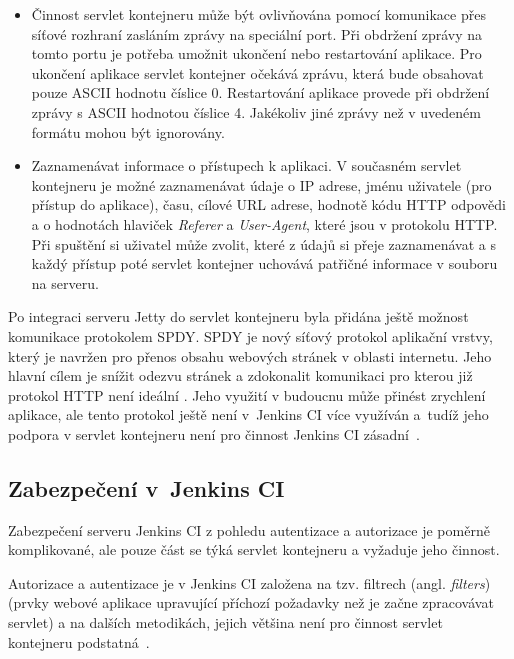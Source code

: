 \begin{itemize}
                \item Činnost servlet kontejneru může být ovlivňována pomocí komunikace přes síťové rozhraní zasláním zprávy
                    na speciální port. Při obdržení zprávy na tomto portu je potřeba umožnit ukončení nebo restartování aplikace.
                    Pro ukončení aplikace servlet kontejner očekává zprávu, která bude obsahovat pouze ASCII hodnotu číslice 0.
                    Restartování aplikace provede při obdržení zprávy s ASCII hodnotou číslice 4. Jakékoliv
                    jiné zprávy než v uvedeném formátu mohou být ignorovány.

                \item Zaznamenávat informace o přístupech k aplikaci. V současném servlet kontejneru je možné zaznamenávat
                    údaje o IP adrese, jménu uživatele (pro přístup do aplikace), času, cílové URL adrese, hodnotě 
                    kódu HTTP odpovědi a o hodnotách hlaviček \emph{Referer} a \emph{User-Agent}, které jsou v protokolu HTTP.
                    Při spuštění si uživatel může zvolit, které z údajů si přeje zaznamenávat a s každý přístup poté 
                    servlet kontejner uchovává patřičné informace v souboru na serveru.

            \end{itemize}
            

            Po integraci serveru Jetty do servlet kontejneru byla přidána ještě možnost
            komunikace protokolem SPDY. SPDY je nový síťový protokol aplikační vrstvy, který je
            navržen pro přenos obsahu webových stránek v oblasti internetu. Jeho hlavní cílem je snížit odezvu stránek a zdokonalit
            komunikaci pro kterou již protokol HTTP není ideální \cite{spdyArticle}.
            Jeho využití v budoucnu může přinést zrychlení aplikace, ale 
            tento protokol ještě není 
            v~Jenkins CI více využíván a~tudíž jeho podpora v servlet kontejneru není pro činnost Jenkins CI zásadní~\cite{kohsukeTopic}.
        
        \subsection{Zabezpečení v~Jenkins CI} \label{secSecurityArchitecture}
            Zabezpečení serveru Jenkins CI z pohledu autentizace a autorizace je poměrně komplikované,
            ale pouze část se týká servlet kontejneru a vyžaduje jeho činnost. 
            
            Autorizace a autentizace je v Jenkins CI založena na tzv. filtrech (angl. \emph{filters})
            (prvky webové aplikace upravující příchozí požadavky než je začne zpracovávat servlet) 
            a na dalších metodikách, jejich většina není pro činnost servlet kontejneru podstatná~\cite{securityArchitectureJenkins}. 
            
